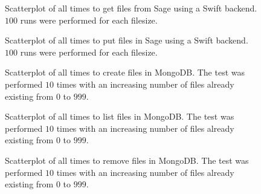 \begin{figure}[!h]
\centering
{}
\caption[SageSwift Get Scatterplot]{Scatterplot of all times to get files from Sage using a Swift backend. $100$ runs were performed for each filesize.}
\label{fig:sageswiftpointlogget}
\end{figure}

\begin{figure}[!h]
\centering
{}
\caption[SageSwift Put Scatterplot]{Scatterplot of all times to put files in Sage using a Swift backend. $100$ runs were performed for each filesize.}
\label{fig:sageswiftpointlogput}
\end{figure}




\begin{figure}[!h]
\centering
{}
\caption[Mongo Create Scatterplot]{Scatterplot of all times to create files in MongoDB. The test was performed $10$ times with an increasing number of files already existing from $0$ to $999$.}
\label{fig:mongocreatescatter}
\end{figure}

\begin{figure}[!h]
\centering
{}
\caption[Mongo List Scatterplot]{Scatterplot of all times to list files in MongoDB. The test was performed $10$ times with an increasing number of files already existing from $0$ to $999$.}
\label{fig:mongolistscatter}
\end{figure}

\begin{figure}[!h]
\centering
{}
\caption[Mongo Remove Scatterplot]{Scatterplot of all times to remove files in MongoDB. The test was performed $10$ times with an increasing number of files already existing from $0$ to $999$.}
\label{fig:mongoremovescatter}
\end{figure}


